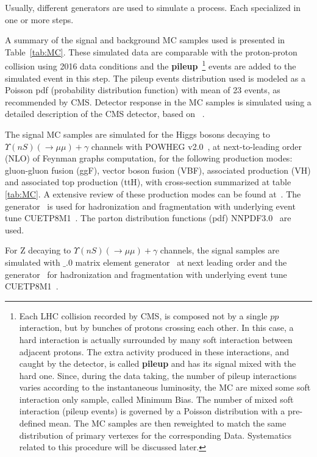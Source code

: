 Usually, different generators are used to simulate a process. Each specialized in one or more steps.

A summary of the signal and background MC samples used is presented in Table~\ref{tab:MC}. These simulated data are comparable with the proton-proton collision using 2016 data conditions and the \textbf{pileup}~\footnote{Each LHC collision recorded by CMS, is composed not by a single $pp$ interaction, but by bunches of protons crossing each other. In this case, a hard interaction is actually surrounded by many soft interaction between adjacent protons. The extra activity produced in these interactions, and caught by the detector, is called \textbf{pileup} and has its signal mixed with the hard one. Since, during the data taking, the number of pileup interactions varies according to the instantaneous luminosity, the MC are mixed some soft interaction only sample, called Minimum Bias. The number of mixed soft interaction (pileup events) is governed by a Poisson distribution with a pre-defined mean. The MC samples are then reweighted to match the same distribution of primary vertexes for the corresponding Data. Systematics related to this procedure will be discussed later.} events are added to the simulated event in this step. The pileup events distribution used is modeled as a Poisson pdf (probability distribution function) with mean of 23 events, as recommended by CMS. Detector response in the MC samples is simulated using a detailed description of the CMS detector, based on \GEANTfour~\cite{Agostinelli:2002hh}.

The signal MC samples are simulated for the Higgs bosons decaying to $\Upsilon(nS) (\rightarrow \mu\mu) + \gamma$  channels with POWHEG v2.0~\cite{powheg2_1,powheg2_2,powheg2_3}, at next-to-leading order (NLO) of Feynman graphs computation, for the following production modes: gluon-gluon fusion (ggF), vector boson fusion (VBF), associated production (VH) and associated top production (ttH), with cross-section summarized at table \ref{tab:MC}. A extensive review of these production modes can be found at~\cite{DJOUADI20081}. The  generator~\cite{SJOSTRAND2008852,Sjostrand:2014zea} is used for hadronization and fragmentation with underlying event tune CUETP8M1~\cite{Khachatryan:2015pea}. The parton distribution functions (pdf) NNPDF3.0~\cite{NNPDF3} are used. 

 For Z decaying to $\Upsilon(nS) (\rightarrow \mu\mu) + \gamma$  channels, the signal samples are simulated with  $\_$.0 matrix element generator~\cite{Alwall2014} at next leading order and the  generator~\cite{SJOSTRAND2008852,Sjostrand:2014zea} for hadronization and fragmentation with underlying event tune CUETP8M1~\cite{Khachatryan:2015pea}.

